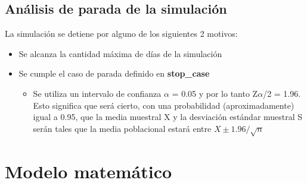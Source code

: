 \documentclass{article}
\begin{document}
			\subsection*{Análisis de parada de la simulación}
			La simulación se detiene por alguno de los siguientes 2 motivos:
			\begin{itemize}[left=3em]
				\item Se alcanza la cantidad máxima de días de la simulación
				\item Se cumple el caso de parada definido en \textbf{stop\_case}
				\begin{itemize}
					\item Se utiliza un intervalo de confianza $\alpha$ = 0.05 y por lo tanto Z{$\alpha$}/2 = 1.96. Esto significa que será cierto, con una probabilidad (aproximadamente) igual a 0.95, que la media muestral X y la desviación estándar muestral S serán tales que la media poblacional estará entre $X \pm 1.96/\sqrt{n}$
				\end{itemize}
			\end{itemize}
			
			\section*{Modelo matemático}
\end{document}
